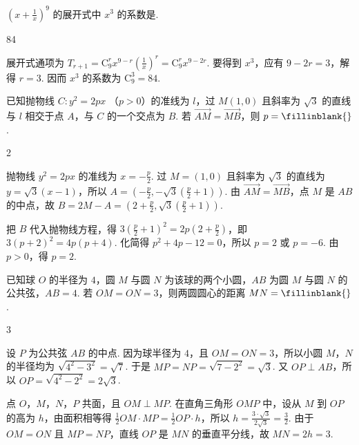 \begin{problem}
\(\left(x + \frac{1}{x}\right)^9\) 的展开式中 \(x^3\) 的系数是\fillinblank{}.
\end{problem}

\begin{answer}
84
\end{answer}

\begin{solution}
展开式通项为 \(T_{r+1}=\mathrm C_9^r x^{9-r}\left(\frac{1}{x}\right)^r=\mathrm C_9^r x^{9-2r}\). 要得到 \(x^3\)，应有 \(9-2r=3\)，解得 \(r=3\). 因而 \(x^3\) 的系数为 \(\mathrm C_9^3=84\).
\end{solution}

\begin{problem}
已知抛物线 \(C: y^{2} = 2px\) （\(p > 0\)）的准线为 \(l\)，过 \(M(1,0)\) 且斜率为 \(\sqrt{3}\) 的直线与 \(l\) 相交于点 \(A\)，与 \(C\) 的一个交点为 \(B\). 若 \(\overrightarrow{AM} = \overrightarrow{MB}\)，则 \(p =\fillinblank{}\).
\end{problem}

\begin{answer}
2
\end{answer}

\begin{solution}
抛物线 \(y^2=2px\) 的准线为 \(x=-\frac{p}{2}\). 过 \(M=(1,0)\) 且斜率为 \(\sqrt{3}\) 的直线为 \(y=\sqrt{3}(x-1)\)，所以 \(A=\left(-\frac{p}{2},-\sqrt{3}\left(\frac{p}{2}+1\right)\right)\). 由 \(\overrightarrow{AM}=\overrightarrow{MB}\)，点 \(M\) 是 \(AB\) 的中点，故 \(B=2M-A=\left(2+\frac{p}{2},\sqrt{3}\left(\frac{p}{2}+1\right)\right)\).

把 \(B\) 代入抛物线方程，得 \(3\left(\frac{p}{2}+1\right)^2=2p\left(2+\frac{p}{2}\right)\)，即 \(3(p+2)^2=4p(p+4)\). 化简得 \(p^2+4p-12=0\)，所以 \(p=2\) 或 \(p=-6\). 由 \(p>0\)，得 \(p=2\).
\end{solution}

\begin{problem}
已知球 \(O\) 的半径为 \(4\)，圆 \(M\) 与圆 \(N\) 为该球的两个小圆，\(AB\) 为圆 \(M\) 与圆 \(N\) 的公共弦，\(AB = 4\). 若 \(OM = ON = 3\)，则两圆圆心的距离 \(MN =\fillinblank{}\).
\end{problem}

\begin{answer}
3
\end{answer}

\begin{solution}
设 \(P\) 为公共弦 \(AB\) 的中点. 因为球半径为 \(4\)，且 \(OM=ON=3\)，所以小圆 \(M\)，\(N\) 的半径均为 \(\sqrt{4^2-3^2}=\sqrt{7}\). 于是 \(MP=NP=\sqrt{7-2^2}=\sqrt{3}\). 又 \(OP\perp AB\)，所以 \(OP=\sqrt{4^2-2^2}=2\sqrt{3}\).

点 \(O\)，\(M\)，\(N\)，\(P\) 共面，且 \(OM\perp MP\). 在直角三角形 \(OMP\) 中，设从 \(M\) 到 \(OP\) 的高为 \(h\)，由面积相等得 \(\frac{1}{2}OM\cdot MP=\frac{1}{2}OP\cdot h\)，所以 \(h=\frac{3\cdot\sqrt{3}}{2\sqrt{3}}=\frac{3}{2}\). 由于 \(OM=ON\) 且 \(MP=NP\)，直线 \(OP\) 是 \(MN\) 的垂直平分线，故 \(MN=2h=3\).
\end{solution}

